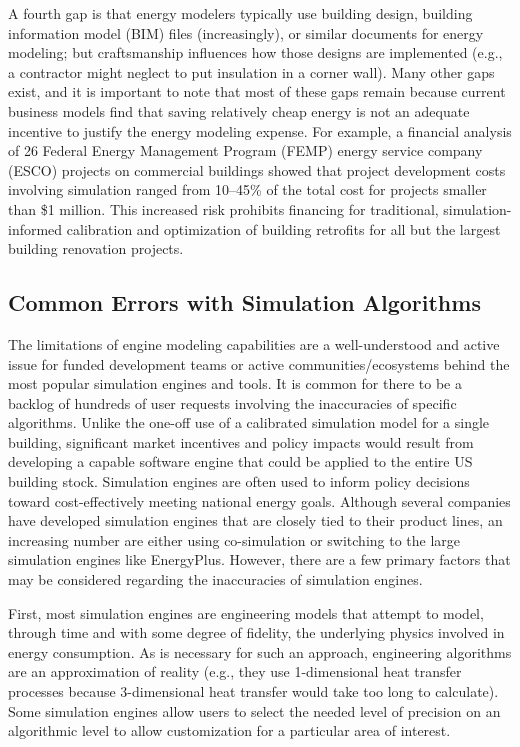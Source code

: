 \documentclass[preprint, review, 12pt]{elsarticle}
\begin{document}
A fourth gap is that energy modelers typically use building design, building information model (BIM) files (increasingly), or similar documents for energy modeling; but craftsmanship influences how those designs are implemented (e.g., a contractor might neglect to put insulation in a corner wall). Many other gaps exist, and it is important to note that most of these gaps remain because current business models find that saving relatively cheap energy is not an adequate incentive to justify the energy modeling expense. For example, a financial analysis of 26 Federal Energy Management Program (FEMP) energy service company (ESCO) projects on commercial buildings showed that project development costs involving simulation ranged from 10--45\% of the total cost for projects smaller than \$1 million. This increased risk %
prohibits financing for traditional, simulation-informed calibration and optimization of building retrofits for all but the largest building renovation projects.

\subsection{Common Errors with Simulation Algorithms}
The limitations of engine modeling capabilities are a well-understood and active issue for funded development teams or active communities/ecosystems behind the most popular simulation engines and tools. It is common for there to be a backlog of hundreds of user requests involving the inaccuracies of specific algorithms. Unlike the one-off use of a calibrated simulation model for a single building, significant market incentives and policy impacts would result from developing a capable software engine that could be applied to the entire US building stock. Simulation engines are often used to inform policy decisions toward cost-effectively meeting national energy goals. Although several companies have developed simulation engines that are closely tied to their product lines, an increasing number are either using co-simulation or switching to the large simulation engines like EnergyPlus. However, there are a few primary factors that may be considered regarding the inaccuracies of simulation engines.

First, most simulation engines are engineering models that attempt to model, through time and with some degree of fidelity, the underlying physics involved in energy consumption. As is necessary for such an approach, engineering algorithms are an approximation of reality (e.g., they use 1-dimensional heat transfer processes because 3-dimensional heat transfer would take too long to calculate). Some simulation engines allow users to select the needed level of precision on an algorithmic level to allow customization for a particular area of interest. 
\end{document}
